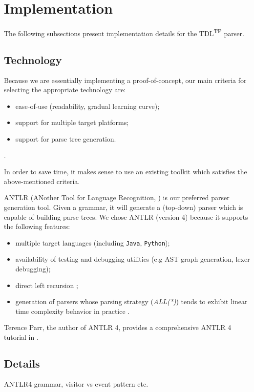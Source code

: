 \documentclass[12pt,oneside,a4paper,notitlepage]{report}
\begin{document}
	\section*{Implementation}
	\par The following subsections present implementation details for the TDL\textsuperscript{TP} parser.

	\subsection*{Technology}
	\par Because we are essentially implementing a proof-of-concept, our main criteria for selecting the appropriate technology are:
	\begin{itemize}
		\item ease-of-use (readability, gradual learning curve);
		\item support for multiple target platforms;
		\item support for parse tree generation.
	\end{itemize}.

	\par In order to save time, it makes sense to use an existing toolkit which satisfies the above-mentioned criteria.

	\bigskip

	\par ANTLR (ANother Tool for Language Recognition, \cite{antlrsite}) is our preferred parser generation tool. Given a grammar, it will generate a (top-down) parser which is capable of building parse trees. We chose ANTLR (version 4) because it supports the following features:
	\begin{itemize}
		\item multiple target languages (including \texttt{Java}, \texttt{Python});
		\item availability of testing and debugging utilities (e.g AST graph generation, lexer debugging);
		\item direct left recursion \cite{antlrrecursion};
		\item generation of parsers whose parsing strategy (\textit{ALL(*)}) tends to exhibit linear time complexity behavior in practice \cite{antlrcomplex}.
	\end{itemize}

	Terence Parr, the author of ANTLR 4, provides a comprehensive ANTLR 4 tutorial in \cite{antlrtutorial}.

	\subsection*{Details}
	\par ANTLR4 grammar, visitor vs event pattern  etc.

	\printbibliography[
		title=Sources
	]
\end{document}
